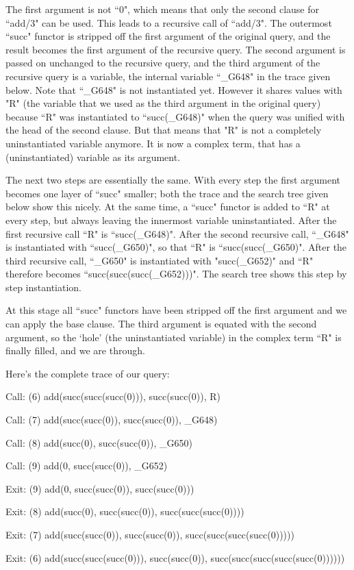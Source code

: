 The first argument is not ``0", which means that only the second clause
for ``add/3" can be used. This leads to a recursive call of ``add/3". The
outermost ``succ" functor is stripped off the first argument of the
original query, and the result becomes the first argument of the
recursive query. The second argument is passed on unchanged to the
recursive query, and the third argument of the recursive query is a
variable, the internal variable ``\_G648" in the trace given below. Note
that ``\_G648" is not instantiated yet. However it shares values with
"R" (the variable that we used as the third argument in the original
query) because ``R" was instantiated to ``succ(\_G648)" when the query
was unified with the head of the second clause. But that means that
"R" is not a completely uninstantiated variable anymore. It is now a
complex term, that has a (uninstantiated) variable as its argument.

The next two steps are essentially the same. With every step the first
argument becomes one layer of ``succ" smaller; both the trace and the
search tree given below show this nicely.  At the same time, a ``succ"
functor is added to ``R" at every step, but always leaving
the innermost variable uninstantiated. After the first recursive
call ``R" is ``succ(\_G648)".  After the second recursive call, ``\_G648"
is instantiated with ``succ(\_G650)", so that ``R" is ``succ(succ(\_G650)".
After the third recursive call, ``\_G650" is instantiated with
"succ(\_G652)" and ``R" therefore becomes ``succ(succ(succ(\_G652)))". The
search tree shows this step by step instantiation.

At this stage all ``succ" functors have been stripped off the first
argument and we can apply the base clause. The third argument is
equated with the second argument, so the  `hole' (the
uninstantiated variable) in the complex term ``R" is finally filled,
and we are through.

Here's the complete trace of our query:
\begin{LPNcodedisplay}
Call: (6) add(succ(succ(succ(0))), succ(succ(0)), R)

Call: (7) add(succ(succ(0)), succ(succ(0)), _G648)

Call: (8) add(succ(0), succ(succ(0)), _G650)

Call: (9) add(0, succ(succ(0)), _G652)

Exit: (9) add(0, succ(succ(0)), succ(succ(0)))

Exit: (8) add(succ(0), succ(succ(0)), succ(succ(succ(0))))

Exit: (7) add(succ(succ(0)), succ(succ(0)),
                                succ(succ(succ(succ(0)))))

Exit: (6) add(succ(succ(succ(0))), succ(succ(0)),
                          succ(succ(succ(succ(succ(0))))))
\end{LPNcodedisplay}

